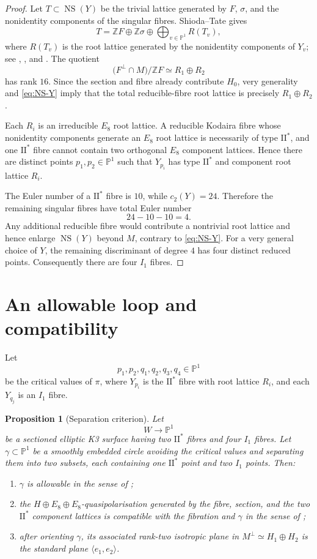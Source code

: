 \documentclass[11pt]{amsart}
\newtheorem{proposition}[theorem]{Proposition}
\theoremstyle{definition}
\newcommand{\NS}{\operatorname{NS}}
\newcommand{\PP}{\mathbb P}
\newcommand{\ZZ}{\mathbb Z}
\begin{document}
\begin{proof}
Let $T\subset\NS(Y)$ be the trivial lattice generated by $F$, $\sigma$, and
the nonidentity components of the singular fibres.  Shioda--Tate gives
\[
T=\ZZ F\oplus\ZZ\sigma\oplus\bigoplus_{v\in\PP^1}R(T_v),
\]
where $R(T_v)$ is the root lattice generated by the nonidentity components of
$Y_v$; see \cite{Shi72}, \cite{Mir89}, and \cite{SS10}.  The quotient
\[
\bigl(F^\perp\cap M\bigr)/\ZZ F
\simeq R_1\oplus R_2
\]
has rank $16$.  Since the section and fibre already contribute $H_0$, very
generality and \eqref{eq:NS-Y} imply that the total reducible-fibre root
lattice is precisely $R_1\oplus R_2$.

Each $R_i$ is an irreducible $E_8$ root lattice.  A reducible Kodaira fibre
whose nonidentity components generate an $E_8$ root lattice is necessarily of
type $\mathrm{II}^*$, and one $\mathrm{II}^*$ fibre cannot contain two
orthogonal $E_8$ component lattices.  Hence there are distinct points
$p_1,p_2\in\PP^1$ such that $Y_{p_i}$ has type $\mathrm{II}^*$ and component
root lattice $R_i$.

The Euler number of a $\mathrm{II}^*$ fibre is $10$, while
$c_2(Y)=24$.  Therefore the remaining singular fibres have total Euler number
\[
24-10-10=4.
\]
Any additional reducible fibre would contribute a nontrivial root lattice and
hence enlarge $\NS(Y)$ beyond $M$, contrary to \eqref{eq:NS-Y}.  For a very
general choice of $Y$, the remaining discriminant of degree $4$ has four
distinct reduced points.  Consequently there are four $I_1$ fibres.
\end{proof}

\section{An allowable loop and compatibility}

Let
\[
p_1,p_2,q_1,q_2,q_3,q_4\in\PP^1
\]
be the critical values of $\pi$, where $Y_{p_i}$ is the $\mathrm{II}^*$ fibre
with root lattice $R_i$, and each $Y_{q_j}$ is an $I_1$ fibre.

\begin{proposition}[Separation criterion]\label{prop:separation-criterion}
Let
\[
W\longrightarrow\PP^1
\]
be a sectioned elliptic K3 surface having two $\mathrm{II}^*$ fibres and four
$I_1$ fibres.  Let $\gamma\subset\PP^1$ be a smoothly embedded circle
avoiding the critical values and separating them into two subsets, each
containing one $\mathrm{II}^*$ point and two $I_1$ points.  Then:
\begin{enumerate}[label=\textup{(\roman*)}]
\item $\gamma$ is allowable in the sense of \cite[Definition~4.11]{GT24};
\item the $H\oplus E_8\oplus E_8$-quasipolarisation generated by the fibre,
section, and the two $\mathrm{II}^*$ component lattices is compatible with
the fibration and $\gamma$ in the sense of
\cite[Definition~4.21]{GT24};
\item after orienting $\gamma$, its associated rank-two isotropic plane in
$M^\perp\simeq H_1\oplus H_2$ is the standard plane
$\langle e_1,e_2\rangle$.
\end{enumerate}
\end{proposition}
\end{document}
